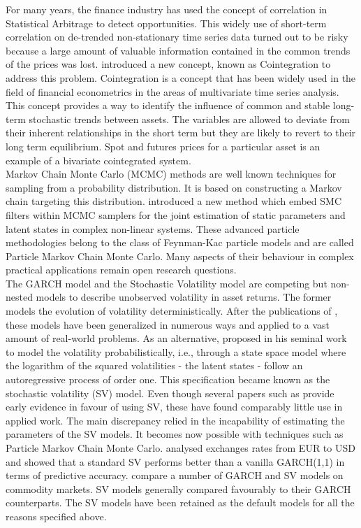 \documentclass[11pt,a4,twosided,singlespacing,titlepagenumber=on]{scrreprt}
\numberwithin{equation}{chapter} %
\theoremstyle{remark}
\begin{document}
For many years, the finance industry has used the concept of correlation in Statistical Arbitrage to detect opportunities. This widely use of short-term correlation on de-trended non-stationary time series data turned out to be risky because a large amount of valuable information contained in the common trends of the prices was lost. \cite{engle1987} introduced a new concept, known as Cointegration to address this problem. Cointegration is a concept that has been widely used in the field of financial econometrics in the areas of multivariate time series analysis. This concept provides a way to identify the influence of common and stable long-term stochastic trends between assets. The variables are allowed to deviate from their inherent relationships in the short term but they are likely to revert to their long term equilibrium. Spot and futures prices for a particular asset is an example of a bivariate cointegrated system. \\


Markov Chain Monte Carlo (MCMC) methods are well known techniques for sampling from a probability distribution. It is based on constructing a Markov chain targeting this distribution. \cite{andrieu2010} introduced a new method which embed SMC filters within MCMC samplers for the joint estimation of static parameters and latent states in complex non-linear systems. These advanced particle methodologies belong to the class of Feynman-Kac particle models and are called Particle Markov Chain Monte Carlo. Many aspects of their behaviour in complex practical applications remain open research questions. \\


The GARCH model and the Stochastic Volatility model are competing but non-nested models to describe unobserved volatility in asset returns. The former models the evolution of volatility deterministically. After the publications of \cite{engle1986}, these models have been generalized in numerous ways and applied to a vast amount of real-world problems. As an alternative, \cite{taylor1982} proposed in his seminal work to model the volatility probabilistically, i.e., through a state space model where the logarithm of the squared volatilities - the latent states - follow an autoregressive process of order one. This specification became known as the stochastic volatility (SV) model. Even though several papers such as \cite{kim1998} provide early evidence in favour of using SV, these have found comparably little use in applied work. The main discrepancy relied in the incapability of estimating the parameters of the SV models. It becomes now possible with techniques such as Particle Markov Chain Monte Carlo. \cite{kastner2014} analysed exchanges rates from EUR to USD and showed that a standard SV performs better than a vanilla GARCH(1,1) in terms of predictive accuracy. \cite{chan2015} compare a number of GARCH and SV models on commodity markets. SV models generally compared favourably to their GARCH counterparts. The SV models have been retained as the default models for all the reasons specified above. \\
\end{document}
